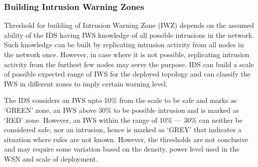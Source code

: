 \documentclass[conference,manuscript]{IEEEtran}
\begin{document}
\subsubsection{Building Intrusion Warning Zones}
\label{ssc:iw_zone}

Threshold for building of Intrusion Warning Zone (IWZ) depends on the assumed ability of the IDS having IWS knowledge of all possible intrusions in the network.
Such knowledge can be built by replicating intrusion activity from all nodes in the network once.
However, in case where it is not possible, replicating intrusion activity from the furthest few nodes may serve the purpose.
IDS can build a scale of possible expected range of IWS for the deployed topology and can classify the IWS in different zones to imply certain warning level.

The IDS considers an IWS upto 10\% from the scale to be safe and marks as `GREEN' zone, an IWS above 30\% to be possible intrusion and is marked as `RED' zone.
However, an IWS within the range of 10\% --- 30\% can neither be considered safe, nor an intrusion, hence is marked as `GREY' that indicates a situation where rules are not known.
However, the thresholds are not conclusive and may require some variation based on the density, power level used in the WSN and scale of deployment.
\end{document}
